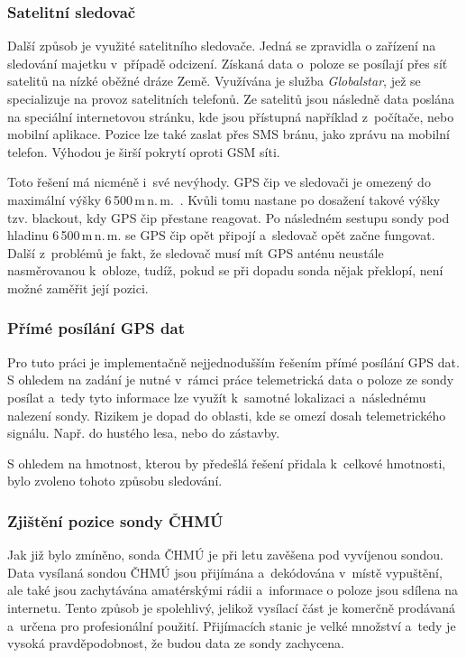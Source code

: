 \documentclass[twoside]{ctuthesis}
\theoremstyle{plain}
\theoremstyle{definition}
\theoremstyle{note}
\begin{document}
				\subsubsection{Satelitní sledovač}
				Další způsob je využité satelitního sledovače. Jedná se zpravidla o zařízení na sledování majetku v~případě odcizení. Získaná data o~poloze se posílají přes síť satelitů na nízké oběžné dráze Země. Využívána je služba \textit{Globalstar}, jež se specializuje na provoz satelitních telefonů. Ze satelitů jsou následně data poslána na speciální internetovou stránku, kde jsou přístupná například z~počítače, nebo mobilní aplikace. Pozice lze také zaslat přes SMS bránu, jako zprávu na mobilní telefon. Výhodou je širší pokrytí oproti GSM síti. 

				Toto řešení má nicméně i~své nevýhody. GPS čip ve sledovači je omezený do maximální výšky 6\,500\,m\,n.\,m.~\cite{web_spot}. Kvůli tomu nastane po dosažení takové výšky tzv. blackout, kdy GPS čip přestane reagovat. Po následném sestupu sondy pod hladinu 6\,500\,m\,n.\,m. se GPS čip opět připojí a~sledovač opět začne fungovat. Další z~problémů je fakt, že sledovač musí mít GPS anténu neustále nasměrovanou k~obloze, tudíž, pokud se při dopadu sonda nějak překlopí, není možné zaměřit její pozici.

				\subsubsection{Přímé posílání GPS dat}
				Pro tuto práci je implementačně nejjednodušším řešením přímé posílání GPS dat. S ohledem na zadání je nutné v~rámci práce telemetrická data o poloze ze sondy posílat a~tedy tyto informace lze využít k~samotné lokalizaci a~následnému nalezení sondy. Rizikem je dopad do oblasti, kde se omezí dosah telemetrického signálu. Např. do hustého lesa, nebo do zástavby.

				S ohledem na hmotnost, kterou by předešlá řešení přidala k~celkové hmotnosti, bylo zvoleno tohoto způsobu sledování.

				\subsubsection{Zjištění pozice sondy ČHMÚ}
				Jak již bylo zmíněno, sonda ČHMÚ je při letu zavěšena pod vyvíjenou sondou. Data vysílaná sondou ČHMÚ jsou přijímána a~dekódována v~místě vypuštění, ale také jsou zachytávána amatérskými rádii a~informace o poloze jsou sdílena na internetu. Tento způsob je spolehlivý, jelikož vysílací část je komerčně prodávaná a~určena pro profesionální použití. Přijímacích stanic je velké množství a~tedy je vysoká pravděpodobnost, že budou data ze sondy zachycena. 
\end{document}
